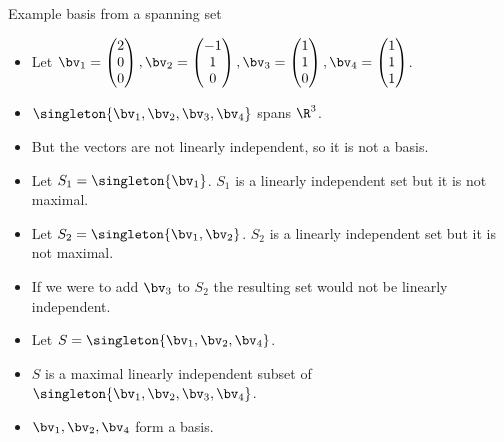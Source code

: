 \documentclass{beamer}
\begin{document}
\begin{frame}{Example basis from a spanning set}

\begin{itemize}
\item Let $\bv_1 =
\begin{pmatrix}
2 \\ 0 \\ 0
\end{pmatrix}
,\bv_2=
\begin{pmatrix}
-1 \\ 1 \\ 0
\end{pmatrix}
,\bv_3=
\begin{pmatrix}
1 \\ 1 \\ 0
\end{pmatrix}
,\bv_4=
\begin{pmatrix}
1 \\ 1 \\ 1
\end{pmatrix}
$.
\item $\singleton{\bv_1,\bv_2,\bv_3,\bv_4}$ spans $\R^3$.
\item But the vectors are not linearly independent, so it is not a basis.
\item Let $S_1 = \singleton{\bv_1}$. $S_1$ is a linearly independent set but it is not maximal.
\item Let $S_2 = \singleton{\bv_1,\bv_2}$. $S_2$ is a linearly independent set but it is not maximal.
\item If we were to add $\bv_3$ to $S_2$ the resulting set would not be linearly independent.
\item Let $S=\singleton{\bv_1,\bv_2,\bv_4}$.
\item $S$ is a maximal linearly independent subset of $\singleton{\bv_1,\bv_2,\bv_3,\bv_4}$.
\item $\bv_1,\bv_2,\bv_4$ form a basis.
\end{itemize}
\end{frame}
\end{document}

